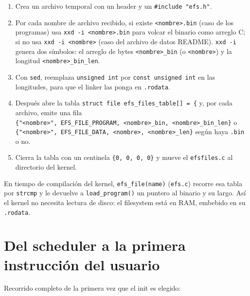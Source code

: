 \documentclass[11pt,a4paper]{article}
\begin{document}
\begin{enumerate}[leftmargin=1.6em]
    \item Crea un archivo temporal con un header y un \texttt{\#include "efs.h"}.
    \item Por cada nombre de archivo recibido, si existe
    \texttt{<nombre>.bin} (caso de los programas) usa \texttt{xxd -i
    <nombre>.bin} para volcar el binario como arreglo C; si no usa \texttt{xxd -i
    <nombre>} (caso del archivo de datos README). \texttt{xxd -i} genera dos
    símbolos: el arreglo de bytes \texttt{<nombre>\_bin} (o \texttt{<nombre>}) y la
    longitud \texttt{<nombre>\_bin\_len}.
    \item Con \texttt{sed}, reemplaza \texttt{unsigned int} por
    \texttt{const unsigned int} en las longitudes, para que el linker las ponga en
    \texttt{.rodata}.
    \item Después abre la tabla \texttt{struct file efs\_files\_table[] = \{} y,
    por cada archivo, emite una fila\\
    \texttt{\{"<nombre>", EFS\_FILE\_PROGRAM, <nombre>\_bin, <nombre>\_bin\_len\}}
    o\\
    \texttt{\{"<nombre>", EFS\_FILE\_DATA, <nombre>, <nombre>\_len\}}
    según haya \texttt{.bin} o no.
    \item Cierra la tabla con un centinela \texttt{\{0, 0, 0, 0\}} y mueve el
    \texttt{efsfiles.c} al directorio del kernel.
\end{enumerate}

En tiempo de compilación del kernel, \texttt{efs\_file(name)} (\texttt{efs.c})
recorre esa tabla por \texttt{strcmp} y le devuelve a \texttt{load\_program()} un
puntero al binario y su largo. Así el kernel no necesita lectura de disco: el
filesystem está en RAM, embebido en su \texttt{.rodata}.

\section{Del scheduler a la primera instrucción del usuario}

Recorrido completo de la primera vez que el init es elegido:
\end{document}
